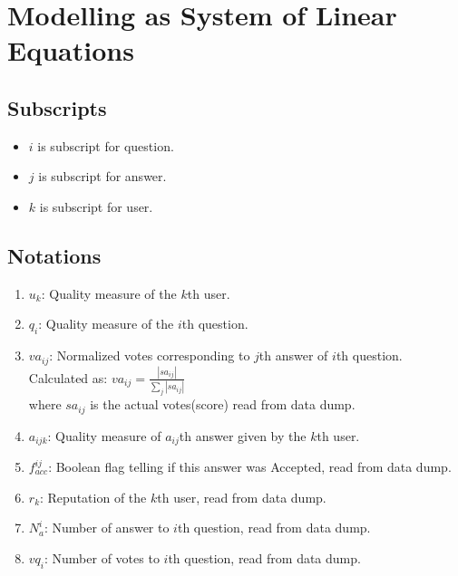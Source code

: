 \documentclass{article}
\begin{document}
\section{Modelling as System of Linear Equations}
\subsection{Subscripts}
\begin{itemize}
    \item $i$ is subscript for question.
    \item $j$ is subscript for answer.
    \item $k$ is subscript for user.
\end{itemize}
\subsection{Notations}
\begin{enumerate}
    \item $u_k$: Quality measure of the $k$th user.
    \item $q_i$: Quality measure of the $i$th question.
    \item $va_{ij}$: Normalized votes corresponding to $j$th answer of $i$th question. \\
        Calculated as: $va_{ij} = \frac{|sa_{ij}|}{\sum_{j} |sa_{ij}|}$ \\
        where $sa_{ij}$ is the actual votes(score) read from data dump.
    \item $a_{ijk}$: Quality measure of $a_{ij}$th answer given by the $k$th user.
    \item $f_{acc}^{ij}$: Boolean flag telling if this answer was Accepted, read from data dump.
    \item $r_k$: Reputation of the $k$th user, read from data dump.
    \item $N_{a}^{i}$: Number of answer to $i$th question, read from data dump.
    \item $vq_{i}$: Number of votes to $i$th question, read from data dump.
\end{enumerate}
\end{document}
